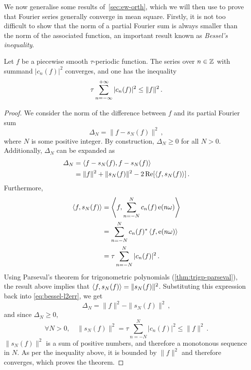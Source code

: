 We now generalise some results of~\cref{sec:ew-orth}, which we will then use to prove that
Fourier series generally converge in mean square. Firstly, it is not too difficult to show
that the norm of a partial Fourier sum is always smaller than the norm of the associated
function, an important result known as \emph{Bessel's inequality}.
\begin{theorem}
  \label{thm:bessel}
  Let $f$ be a piecewise smooth $\tau$-periodic function. The series over $n\in\mathbb{Z}$ with
  summand $|c_n(f)|^2$ converges, and one has the inequality
  \begin{equation}
    \tau\sum_{n=-\infty}^{+\infty}|c_n(f)|^2\leq\|f\|^2\,.
  \end{equation}
\end{theorem}
\begin{proof}
  We consider the norm of the difference between $f$ and its partial Fourier sum
  \begin{equation}
    \Delta_N=\|f-s_N(f)\|^2\,,
  \end{equation}
  where $N$ is some positive integer. By construction, $\Delta_N\geq 0$ for all $N>0$.
  Additionally, $\Delta_N$ can be expanded as
  \begin{align}
    \Delta_N&=\braket{f-s_N(f),f-s_N(f)}\\
    &=\|f\|^2+\|s_N(f)\|^2-2\operatorname{Re}[\braket{f,s_N(f)}]\,.\label{eq:bessel-l2err}
  \end{align}
  Furthermore,
  \begin{align}
    \braket{f,s_N(f)}&=\Braket{f,\sum_{n=-N}^{N}c_n(f)\operatorname{e}(n\omega)}\\
    &=\sum_{n=-N}^{N}c_n(f)^*\braket{f,\operatorname{e}(n\omega)}\\
    &=\tau\sum_{n=-N}^{N}|c_n(f)|^2\,.
  \end{align}
  Using Parseval's theorem for trigonometric polynomials (\cref{thm:trigp-parseval}), the
  result above implies that $\braket{f,s_N(f)}=\|s_N(f)\|^2$. Substituting this expression
  back into \cref{eq:bessel-l2err}, we get
  \begin{equation}
    \Delta_N=\|f\|^2-\|s_N(f)\|^2\,,
  \end{equation}
  and since $\Delta_N\geq 0$,
  \begin{equation}
    \forall N>0,\quad \|s_N(f)\|^2=\tau\sum_{n=-N}^{N}|c_n(f)|^2\leq \|f\|^2\,.
  \end{equation}
  $\|s_N(f)\|^2$ is a sum of positive numbers, and therefore a monotonous sequence in $N$.
  As per the inequality above, it is bounded by $\|f\|^2$ and therefore converges, which
  proves the theorem.
\end{proof}
